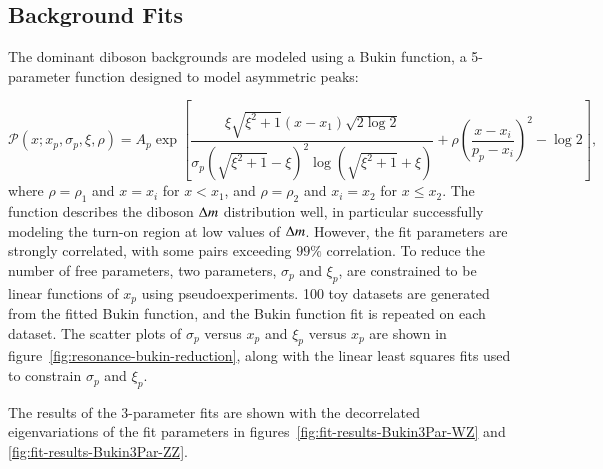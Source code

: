 \clearpage

\subsection{Background Fits}
The dominant diboson backgrounds are modeled using a Bukin function, a 5-parameter function designed to model asymmetric peaks:

\begin{equation}
\mathcal{P}(x;x_p ,\sigma_p, \xi ,\rho)=A_p \exp \left [ \frac{\xi \sqrt{\xi^2+1} (x-x_1) \sqrt{2\log2}}{\sigma_p(\sqrt{\xi^2+1}-\xi)^2 \log (\sqrt{\xi^2+1}+\xi)}+ \rho( \frac{x-x_i}{p_p-x_i})^2 - \log2\right ] ,
\end{equation}
where $\rho = \rho_1$ and $x = x_i$ for $x < x_1$, and $\rho = \rho_2$ and $x_i = x_2$ for $x \leq x_2$. The function describes the diboson $\Delta m$ distribution well, in particular successfully modeling the turn-on region at low values of $\Delta m$. However, the fit parameters are strongly correlated, with some pairs exceeding $99\%$ correlation. To reduce the number of free parameters, two parameters, $\sigma_p$ and $\xi_p$, are constrained to be linear functions of $x_p$ using pseudoexperiments. 100 toy datasets are generated from the fitted Bukin function, and the Bukin function fit is repeated on each dataset. The scatter plots of $\sigma_p$ versus $x_p$ and $\xi_p$ versus $x_p$ are shown in figure~\ref{fig:resonance-bukin-reduction}, along with the linear least squares fits used to constrain $\sigma_p$ and $\xi_p$. 

The results of the 3-parameter fits are shown with the decorrelated eigenvariations of the fit parameters in figures~\ref{fig:fit-results-Bukin3Par-WZ} and \ref{fig:fit-results-Bukin3Par-ZZ}. 

